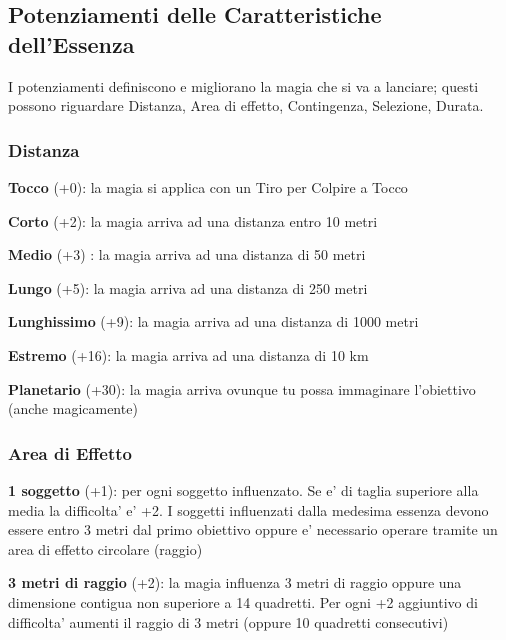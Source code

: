 \documentclass[a4paper,11pt,twoside,openany]{book}
\begin{document}
\subsection{Potenziamenti delle Caratteristiche dell'Essenza}

\label{potenziamenti-delle-caratteristiche-dellessenza}

I potenziamenti definiscono e migliorano la magia che si va a lanciare; questi possono riguardare Distanza, Area di effetto, Contingenza, Selezione, Durata.

\subsubsection{Distanza}

\label{distanza}

\textbf{Tocco} (+0): la magia si applica con un Tiro per Colpire a
Tocco

\textbf{Corto} (+2): la magia arriva ad una distanza entro 10 metri

\textbf{Medio} (+3) : la magia arriva ad una distanza di 50 metri

\textbf{Lungo} (+5): la magia arriva ad una distanza di 250 metri

\textbf{Lunghissimo} (+9): la magia arriva ad una distanza di 1000 metri

\textbf{Estremo} (+16): la magia arriva ad una distanza di 10 km

\textbf{Planetario} (+30): la magia arriva ovunque tu possa immaginare l'obiettivo (anche magicamente)

\subsubsection{Area di Effetto}

\label{area-di-effetto}

\textbf{1 soggetto} (+1): per ogni soggetto influenzato. Se e' di taglia superiore alla media la difficolta' e' +2. I soggetti influenzati dalla medesima essenza devono essere entro 3 metri dal primo obiettivo oppure e' necessario operare tramite un area di effetto circolare (raggio)

\textbf{3 metri di raggio} (+2): la magia influenza 3 metri di raggio oppure una dimensione contigua non superiore a 14 quadretti. Per ogni +2 aggiuntivo di difficolta' aumenti il raggio di 3 metri (oppure 10 quadretti consecutivi)
\end{document}
